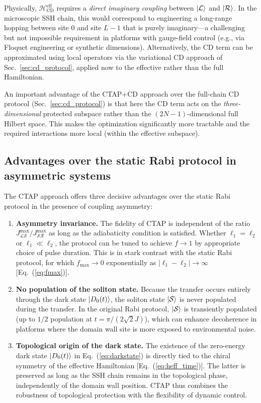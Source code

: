 \documentclass[
  reprint,
  amsmath,
  amssymb,
  aps,
  prb,
  floatfix,
  longbibliography,
]{revtex4-2}
\newcommand{\JLS}{J_{\mathcal{LS}}}
\newcommand{\JSR}{J_{\mathcal{SR}}}
\newcommand{\ketL}{\ket{\mathcal{L}}}
\newcommand{\ketS}{\ket{\mathcal{S}}}
\newcommand{\ketR}{\ket{\mathcal{R}}}
\begin{document}
Physically, $\mathcal{H}_{\mathrm{CD}}^{\mathrm{eff}}$ requires a
\emph{direct imaginary coupling} between $\ketL$ and $\ketR$. In the
microscopic SSH chain, this would correspond to engineering a long-range
hopping between site $0$ and site $L - 1$ that is purely imaginary---a
challenging but not impossible requirement in platforms with gauge-field
control (e.g., via Floquet engineering or synthetic dimensions). Alternatively,
the CD term can be approximated using local operators via the variational CD
approach of Sec.~\ref{sec:cd_protocol}, applied now to the effective rather
than the full Hamiltonian.

An important advantage of the CTAP+CD approach over the full-chain CD
protocol (Sec.~\ref{sec:cd_protocol}) is that here the CD term acts on
the \emph{three-dimensional} protected subspace rather than the
$(2N-1)$-dimensional full Hilbert space. This makes the optimization
significantly more tractable and the required interactions more local (within
the effective subspace).

\subsection{Advantages over the static Rabi protocol in asymmetric systems}
\label{sec:ctap_advantages}

The CTAP approach offers three decisive advantages over the static Rabi
protocol in the presence of coupling asymmetry:

\begin{enumerate}
  \item \textbf{Asymmetry invariance.} The fidelity of CTAP is independent
    of the ratio $\JLS^{\max}/\JSR^{\max}$ as long as the adiabaticity
    condition is satisfied. Whether $\ell_1 = \ell_2$ or $\ell_1 \ll \ell_2$,
    the protocol can be tuned to achieve $f \to 1$ by appropriate choice of
    pulse duration. This is in stark contrast with the static Rabi protocol,
    for which $f_{\max} \to 0$ exponentially as $|\ell_1 - \ell_2| \to \infty$
    [Eq.~(\ref{eq:fmax})].

  \item \textbf{No population of the soliton state.} Because the transfer
    occurs entirely through the dark state $\ket{D_0(t)}$, the soliton state
    $\ketS$ is never populated during the transfer. In the original Rabi
    protocol, $\ketS$ is transiently populated (up to $1/2$ population at
    $t = \pi/(2\sqrt{2}J)$), which can enhance decoherence in platforms
    where the domain wall site is more exposed to environmental noise.

  \item \textbf{Topological origin of the dark state.} The existence of the
    zero-energy dark state $\ket{D_0(t)}$ in Eq.~(\ref{eq:darkstate}) is
    directly tied to the chiral symmetry of the effective Hamiltonian
    [Eq.~(\ref{eq:heff_time})]. The latter is preserved as long as the SSH
    chain remains in the topological phase, independently of the domain wall
    position. CTAP thus combines the robustness of topological protection
    with the flexibility of dynamic control.
\end{enumerate}
\end{document}
